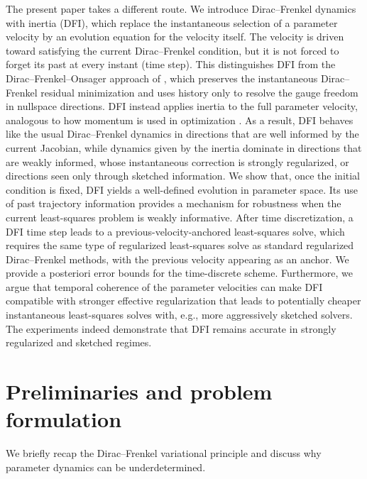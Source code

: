 \documentclass[oneside,11pt]{article}
\theoremstyle{remark}
\theoremstyle{thmstyleone}
\theoremstyle{thmstylethree}
\theoremstyle{thmstyletwo}
\newcommand{\tc}[1]{#1}
\begin{document}
The present paper takes a different route. We introduce Dirac--Frenkel dynamics with inertia (DFI), which replace the instantaneous selection of a parameter velocity by an evolution equation for the velocity itself. The velocity is driven toward satisfying the current Dirac--Frenkel condition, but it is not forced to forget its past at every instant (time step).
This distinguishes DFI from the Dirac--Frenkel--Onsager approach of \cite{RP26DFO}, which preserves the instantaneous Dirac--Frenkel residual minimization and uses history only to resolve the gauge freedom in nullspace directions. DFI instead applies inertia to the full parameter velocity, analogous to how momentum is used in optimization \cite{POLYAK19641,doi:10.1142/S0219199700000025,pmlr-v202-muller23b,GOLDSHLAGER2024113351,guzman-cordero2025improving,nouy2026naturalgradientdescentmomentum}. As a result, DFI behaves like the usual Dirac--Frenkel dynamics in directions that are well informed by the current Jacobian, while dynamics given by the inertia dominate in directions that are weakly informed, whose instantaneous correction is strongly regularized, or directions seen only through sketched information. \tc{We show that, once the initial condition is fixed, DFI yields a well-defined evolution in parameter space. Its use of past trajectory information provides a mechanism for robustness when the current least-squares problem is weakly informative.}
After time discretization, a DFI time step leads to a previous-velocity-anchored least-squares solve, which requires the same type of regularized least-squares solve as standard regularized Dirac--Frenkel methods, with the previous velocity appearing as an anchor.
      \tc{We provide a posteriori error bounds for the time-discrete scheme. Furthermore, we argue that temporal coherence of the parameter velocities can make DFI compatible with stronger effective regularization that leads to potentially cheaper instantaneous least-squares solves with, e.g., more aggressively sketched solvers. The experiments indeed demonstrate that DFI remains accurate in strongly regularized and sketched regimes.}

\section{Preliminaries and problem formulation}
\label{sec:setting}
We briefly recap the Dirac--Frenkel variational principle and discuss why parameter dynamics can be underdetermined. 
\end{document}
